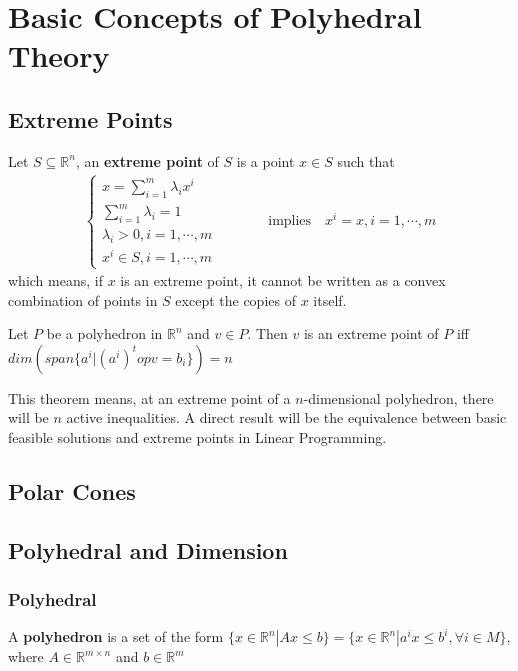 		\chapter{Basic Concepts of Polyhedral Theory}
			\section{Extreme Points}
				\begin{definition}
					Let $S \subseteq \mathbb{R}^n$, an \textbf{extreme point} of $S$ is a point $x \in S$ such that
					\begin{align}
						\begin{cases}
						 	x = \sum_{i = 1}^m \lambda_ix^i &\\
							\sum_{i = 1}^m \lambda_i = 1&\\
							\lambda_i > 0, i = 1, \cdots, m&\\
							x^i \in S, i = 1, \cdots, m&
						\end{cases} \quad & \quad \text{implies} \quad  x^i = x, i = 1, \cdots, m
					\end{align}
					which means, if $x$ is an extreme point, it cannot be written as a convex combination of points in $S$ except the copies of $x$ itself.
				\end{definition}

				\begin{theorem}
					Let $P$ be a polyhedron in $\mathbb{R}^n$ and $v \in P$. Then $v$ is an extreme point of $P$ iff $dim(span\{a^i | (a^i)^top v = b_i\}) = n$
				\end{theorem}

				This theorem means, at an extreme point of a $n$-dimensional polyhedron, there will be $n$ active inequalities. A direct result will be the equivalence between basic feasible solutions and extreme points in Linear Programming.

			\section{Polar Cones}

			\section{Polyhedral and Dimension}
				\subsection{Polyhedral}
					\begin{definition}[polyhedron]
						A \textbf{polyhedron} is a set of the form $\{x\in \mathbb{R}^n | Ax \le b\}=\{x \in \mathbb{R}^n | a^ix\le b^i, \forall i \in M\}$, where $A \in \mathbb{R}^{m\times n}$ and $b \in \mathbb{R}^m$
					\end{definition}


